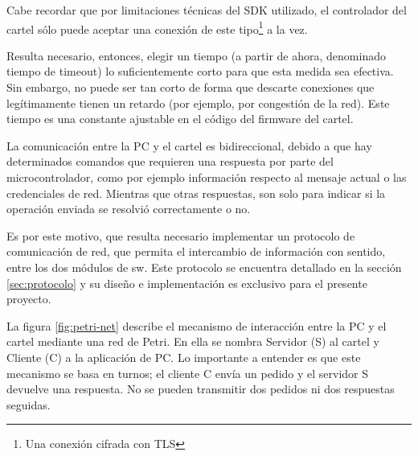 Cabe recordar que por limitaciones técnicas del SDK utilizado, el controlador del cartel sólo puede aceptar una conexión de este tipo\footnote{Una conexión cifrada con TLS} a la vez. 

Resulta necesario, entonces, elegir un tiempo (a partir de ahora, denominado tiempo de timeout) lo suficientemente corto para que esta medida sea efectiva. Sin embargo, no puede ser tan corto de forma que descarte conexiones que legítimamente tienen un retardo (por ejemplo, por congestión de la red).  Este tiempo es una constante ajustable en el código del firmware del cartel.

La comunicación entre la PC y el cartel es bidireccional, debido a que hay determinados comandos que requieren una respuesta por parte del microcontrolador, como por ejemplo información respecto al mensaje actual o las credenciales de red.
Mientras que otras respuestas, son solo para indicar si la operación enviada se resolvió correctamente o no.

Es por este motivo, que resulta necesario implementar un protocolo de comunicación de red, que permita el intercambio de información con sentido, entre los dos módulos de sw.
Este protocolo se encuentra detallado en la sección \ref{sec:protocolo} y su diseño e implementación es exclusivo para el presente proyecto.

La figura \ref{fig:petri-net} describe el mecanismo de interacción entre la PC y el cartel mediante una red de Petri. En ella se nombra Servidor (S) al cartel y Cliente (C) a la aplicación de PC. Lo importante a entender es que este mecanismo se basa en turnos; el cliente C envía un pedido y el servidor S devuelve una respuesta. No se pueden transmitir dos pedidos ni dos respuestas seguidas.

